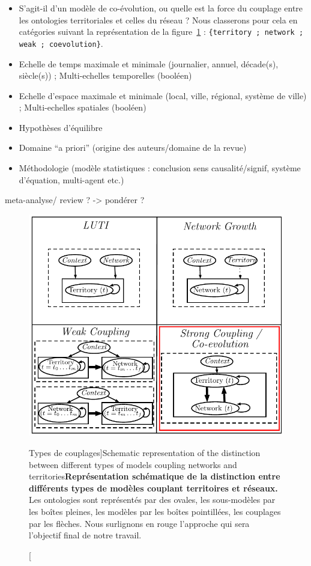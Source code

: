 \begin{itemize}
\item S'agit-il d'un modèle de co-évolution, ou quelle est la force du couplage entre les ontologies territoriales et celles du réseau ? Nous classerons pour cela en catégories suivant la représentation de la figure~\ref{fig:modelography:coevolution} : \texttt{\{territory ; network ; weak ; coevolution\}}.
\item Echelle de temps maximale et minimale (journalier, annuel, décade(s), siècle(s)) ; Multi-echelles temporelles (booléen)
\item Echelle d'espace maximale et minimale (local, ville, régional, système de ville) ; Multi-echelles spatiales (booléen)
\item Hypothèses d'équilibre
\item Domaine ``a priori'' (origine des auteurs/domaine de la revue)
\item Méthodologie (modèle statistiques : conclusion sens causalité/signif, système d'équation, multi-agent etc.)
\end{itemize}

meta-analyse/ review ? -> pondérer ?

\begin{figure}
\includegraphics[width=\linewidth]{Figures/Modelography/coevolution}
\caption[Coupling types][Types de couplages]{Schematic representation of the distinction between different types of models coupling networks and territories}{\textbf{Représentation schématique de la distinction entre différents types de modèles couplant territoires et réseaux.} Les ontologies sont représentés par des ovales, les sous-modèles par les boîtes pleines, les modèles par les boîtes pointillées, les couplages par les flèches. Nous surlignons en rouge l'approche qui sera l'objectif final de notre travail.}
\label{fig:modelography:coevolution}
\end{figure}


